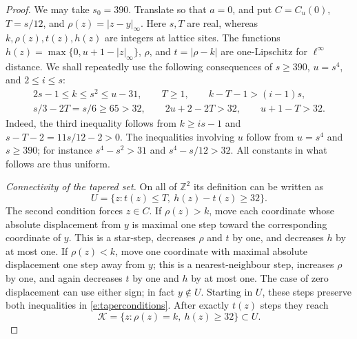 \begin{proof}
We may take \(s_0=390\).  Translate so that \(a=0\), and put
\(C=C_u(0)\), \(T=s/12\), and \(\rho(z)=|z-y|_\infty\).
Here \(s,T\) are real, whereas \(k,\rho(z),t(z),h(z)\) are
integers at lattice sites.
The functions \(h(z)=\max\{0,u+1-|z|_\infty\}\), \(\rho\),
and \(t=|\rho-k|\) are one-Lipschitz for \(\ell^\infty\)
distance.  We shall repeatedly use the following consequences of
\(s\ge390\), \(u=s^4\), and \(2\le i\le s\):
\begin{equation}\label{e:sitecutscales}
 \begin{gathered}
 2s-1\le k\le s^2\le u-31,\qquad T\ge1,\qquad
 k-T-1>(i-1)s,\\
 s/3-2T=s/6\ge65>32,\qquad
 2u+2-2T>32,\qquad u+1-T>32.
 \end{gathered}
\end{equation}
Indeed, the third inequality follows from
\(k\ge is-1\) and \(s-T-2=11s/12-2>0\).
The inequalities involving \(u\) follow from \(u=s^4\)
and \(s\ge390\); for instance \(s^4-s^2>31\) and
\(s^4-s/12>32\).  All constants in what follows are thus uniform.

\emph{Connectivity of the tapered set.}
On all of \(\mathbb Z^2\) its definition can be written as
\begin{equation}\label{e:taperconditions}
 U=\{z:t(z)\le T,\ h(z)-t(z)\ge32\}.
\end{equation}
The second condition forces \(z\in C\).
If \(\rho(z)>k\), move each coordinate whose absolute
displacement from \(y\) is maximal one step toward the corresponding
coordinate of \(y\).  This is a star-step, decreases \(\rho\)
and \(t\) by one, and decreases \(h\) by at most one.
If \(\rho(z)<k\), move one coordinate with maximal absolute
displacement one step away from \(y\); this is a nearest-neighbour
step, increases \(\rho\) by one, and again decreases \(t\) by
one and \(h\) by at most one.  The case of zero displacement can
use either sign; in fact \(y\notin U\).  Starting in \(U\),
these steps preserve both inequalities in
\eqref{e:taperconditions}.  After exactly \(t(z)\) steps they
reach
\[
 \mathcal K=\{z:\rho(z)=k,\ h(z)\ge32\}\subset U.
\]


\end{proof}
